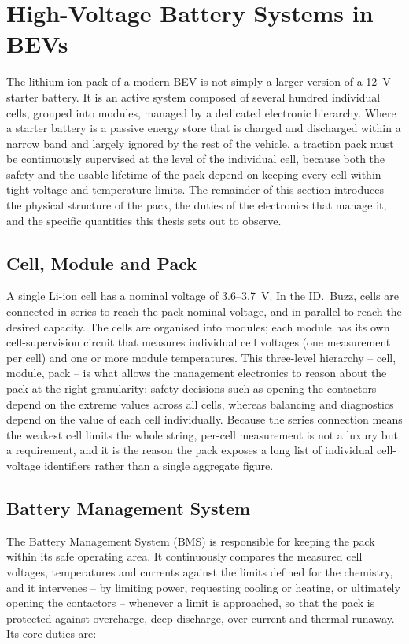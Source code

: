 \documentclass[11pt,a4paper,oneside,parskip=half]{scrreprt}
\begin{document}
\section{High-Voltage Battery Systems in BEVs}
The lithium-ion pack of a modern BEV is not simply a larger version of a 12~V starter battery. It is an active system composed of several hundred individual cells, grouped into modules, managed by a dedicated electronic hierarchy. Where a starter battery is a passive energy store that is charged and discharged within a narrow band and largely ignored by the rest of the vehicle, a traction pack must be continuously supervised at the level of the individual cell, because both the safety and the usable lifetime of the pack depend on keeping every cell within tight voltage and temperature limits. The remainder of this section introduces the physical structure of the pack, the duties of the electronics that manage it, and the specific quantities this thesis sets out to observe.

\subsection{Cell, Module and Pack}
A single Li-ion cell has a nominal voltage of 3.6--3.7~V. In the ID.~Buzz, cells are connected in series to reach the pack nominal voltage, and in parallel to reach the desired capacity. The cells are organised into modules; each module has its own cell-supervision circuit that measures individual cell voltages (one measurement per cell) and one or more module temperatures. This three-level hierarchy -- cell, module, pack -- is what allows the management electronics to reason about the pack at the right granularity: safety decisions such as opening the contactors depend on the extreme values across all cells, whereas balancing and diagnostics depend on the value of each cell individually. Because the series connection means the weakest cell limits the whole string, per-cell measurement is not a luxury but a requirement, and it is the reason the pack exposes a long list of individual cell-voltage identifiers rather than a single aggregate figure.

\subsection{Battery Management System}
The Battery Management System (BMS) is responsible for keeping the pack within its safe operating area. It continuously compares the measured cell voltages, temperatures and currents against the limits defined for the chemistry, and it intervenes -- by limiting power, requesting cooling or heating, or ultimately opening the contactors -- whenever a limit is approached, so that the pack is protected against overcharge, deep discharge, over-current and thermal runaway. Its core duties are:
\end{document}
